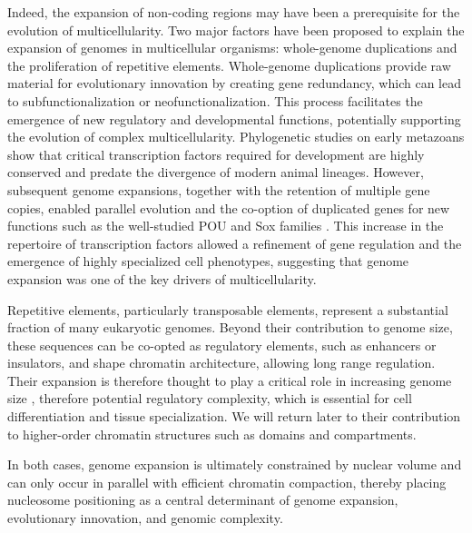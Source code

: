 \documentclass[11pt]{book}
\begin{document}
Indeed, the expansion of non-coding regions may have been a prerequisite for the evolution of multicellularity\cite{binghamNonadaptiveExplanationMacroevolutionary2024}.
Two major factors have been proposed to explain the expansion of genomes in multicellular organisms: whole-genome duplications and the proliferation of repetitive elements.
Whole-genome duplications provide raw material for evolutionary innovation by creating gene redundancy, which can lead to subfunctionalization or neofunctionalization. This process facilitates the emergence of new regulatory and developmental functions, potentially supporting the evolution of complex multicellularity\cite{vandepeerEvolutionarySignificanceAncient2009}. Phylogenetic studies on early metazoans show that critical transcription factors required for development are highly conserved and predate the divergence of modern animal lineages. However, subsequent genome expansions, together with the retention of multiple gene copies, enabled parallel evolution and the co-option of duplicated genes for new functions \cite{larroux_genesis_2008} such as the well-studied POU \cite{phillips_virtuoso_2000} and Sox families \cite{wilson_matching_2002}. This increase in the repertoire of transcription factors allowed a refinement of gene regulation and the emergence of highly specialized cell phenotypes, suggesting that genome expansion was one of the key drivers of multicellularity.

Repetitive elements, particularly transposable elements, represent a substantial fraction of many eukaryotic genomes. Beyond their contribution to genome size, these sequences can be co-opted as regulatory elements, such as enhancers or insulators\cite{chuong_regulatory_2017}, and shape chromatin architecture, allowing long range regulation\cite{cournac_3d_2016}. Their expansion is therefore thought to play a critical role in increasing genome size \cite{schartl_genomes_2024}, therefore potential regulatory complexity, which is essential for cell differentiation and tissue specialization. We will return later to their contribution to higher-order chromatin structures such as domains and compartments.

In both cases, genome expansion is ultimately constrained by nuclear volume and can only occur in parallel with efficient chromatin compaction, thereby placing nucleosome positioning as a central determinant of genome expansion, evolutionary innovation, and genomic complexity.

\end{document}
